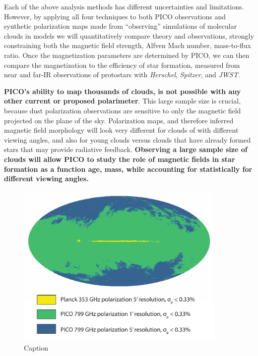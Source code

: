 \documentclass[PICOReport.tex]{subfiles}
\begin{document}
Each of the above analysis methods has different uncertainties and limitations.  However, by applying all four techniques to both PICO observations and synthetic polarization maps made from ``observing'' simulations of molecular clouds in models we will quantitatively compare theory and observations, strongly constraining both the magnetic field strength, Alfven Mach number, mass-to-flux ratio.  Once the magnetization parameters are determined by PICO, we can then compare the magnetization to the efficiency of star formation, measured from near and far-IR observations of protostars with {\em Herschel}, {\em Spitzer}, 
and {\em JWST}. 

{\bf PICO's ability to map thousands of clouds, is not possible with any other current or proposed polarimeter}. This large sample size is crucial, because dust polarization observations are sensitive to only the magnetic field projected on the plane of the sky.  Polarization maps, and therefore inferred magnetic field morphology will look very different for clouds of with different viewing angles, and also for young clouds versus clouds that have already formed stars that may provide radiative feedback.  {\bf Observing a large sample size of clouds will allow PICO to study the role of magnetic fields in star formation as a 
function age, mass, while accounting for statistically for different viewing angles.} \\

\begin{figure}
    \centering
    \includegraphics[width=4in]{images/Allsky_dust_fig.pdf}
    \caption{Caption}
    \label{fig:allsky}
  \end{figure}
\end{document}
